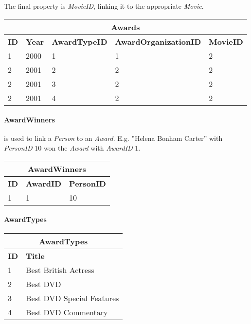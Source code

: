 The final property is \textit{MovieID}, linking it to the appropriate \textit{Movie}.

\begin{center}
\begin{tabular}{|l|l|l|l|l|}
\hline
\multicolumn{5}{|c|}{Awards} \\ \hline \hline
\textbf{ID} & \textbf{Year} & \textbf{AwardTypeID} & \textbf{AwardOrganizationID} & \textbf{MovieID} \\ \hline \hline
1 & 2000 & 1 & 1 & 2 \\ \hline
2 & 2001 & 2 & 2 & 2 \\ \hline
2 & 2001 & 3 & 2 & 2 \\ \hline
2 & 2001 & 4 & 2 & 2 \\ \hline
\end{tabular}
\end{center}

\paragraph{AwardWinners} is used to link a \textit{Person} to an \textit{Award}.
E.g. ''Helena Bonham Carter'' with \textit{PersonID} 10 won the \textit{Award} with \textit{AwardID} 1.

\begin{center}
\begin{tabular}{|l|l|l|}
\hline
\multicolumn{3}{|c|}{AwardWinners} \\ \hline \hline
\textbf{ID} & \textbf{AwardID} & \textbf{PersonID} \\ \hline \hline
1 & 1 & 10 \\ \hline
\end{tabular}
\end{center}

\paragraph{AwardTypes}

\begin{center}
\begin{tabular}{|l|l|}
\hline
\multicolumn{2}{|c|}{AwardTypes} \\ \hline \hline
\textbf{ID} & \textbf{Title} \\ \hline \hline
1 & Best British Actress \\ \hline
2 & Best DVD \\ \hline
3 & Best DVD Special Features \\ \hline
4 & Best DVD Commentary \\ \hline
\end{tabular}
\end{center}

